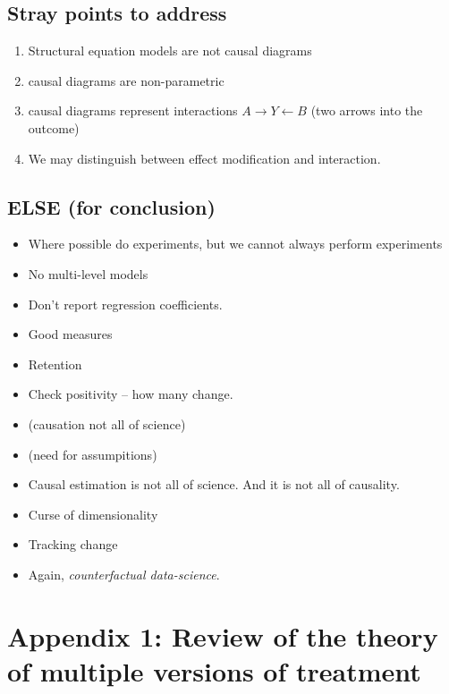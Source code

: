 \documentclass[
  singlecolumn]{report}
\providecommand{\tightlist}{%
  \setlength{\itemsep}{0pt}\setlength{\parskip}{0pt}}\usepackage{longtable,booktabs,array}
\begin{document}
\hypertarget{stray-points-to-address}{%
\subsection{Stray points to address}\label{stray-points-to-address}}

\begin{enumerate}
\def\labelenumi{\arabic{enumi}.}
\tightlist
\item
  Structural equation models are not causal diagrams
\item
  causal diagrams are non-parametric
\item
  causal diagrams represent interactions \(A \to Y \leftarrow B\) (two
  arrows into the outcome)
\item
  We may distinguish between effect modification and interaction.
\end{enumerate}

\hypertarget{else-for-conclusion}{%
\subsection{ELSE (for conclusion)}\label{else-for-conclusion}}

\begin{itemize}
\tightlist
\item
  Where possible do experiments, but we cannot always perform
  experiments
\item
  No multi-level models
\item
  Don't report regression coefficients.
\item
  Good measures
\item
  Retention
\item
  Check positivity -- how many change.
\item
  (causation not all of science)
\item
  (need for assumpitions)
\item
  Causal estimation is not all of science. And it is not all of
  causality.
\item
  Curse of dimensionality
\item
  Tracking change
\item
  Again, \emph{counterfactual data-science}.
\end{itemize}

\hypertarget{appendix-1-review-of-the-theory-of-multiple-versions-of-treatment}{%
\section{Appendix 1: Review of the theory of multiple versions of
treatment}\label{appendix-1-review-of-the-theory-of-multiple-versions-of-treatment}}
\end{document}
